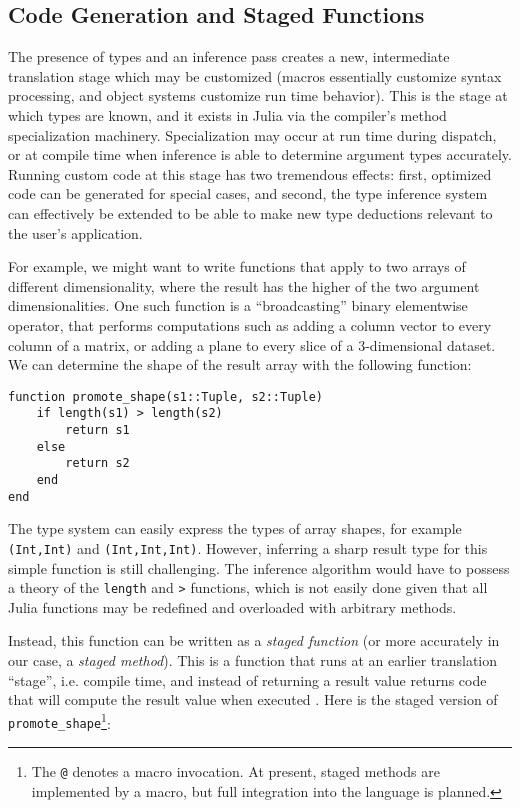 \documentclass[9pt]{sigplanconf}
\begin{document}
\subsection{Code Generation and Staged Functions}

The presence of types and an inference pass creates a new, intermediate
translation stage which may be customized (macros essentially customize
syntax processing, and object systems customize run time behavior).
This is the stage at which types are known, and it exists in Julia via
the compiler's method specialization machinery. Specialization may occur
at run time during dispatch, or at compile time when inference is able
to determine argument types accurately.
Running custom code at this stage has two tremendous effects:
first, optimized code can be generated for special cases, and
second, the type inference system can effectively be extended to be able to
make new type deductions relevant to the user's application.

For example, we might want to write functions that apply to two
arrays of different dimensionality, where the result has the higher of the
two argument dimensionalities. One such function is a ``broadcasting''
binary elementwise operator, that performs computations such as adding a
column vector to every column of a matrix, or adding a plane to every slice
of a 3-dimensional dataset. We can determine the shape of the result
array with the following function:

\begin{verbatim}
function promote_shape(s1::Tuple, s2::Tuple)
    if length(s1) > length(s2)
        return s1
    else
        return s2
    end
end
\end{verbatim}

The type system can easily express the types of array shapes, for example
{\tt (Int,Int)} and {\tt (Int,Int,Int)}. However, inferring a sharp result
type for this simple function is still challenging. The inference algorithm
would have to possess a theory of the {\tt length} and {\tt >} functions,
which is not easily done given that all Julia functions may be redefined
and overloaded with arbitrary methods.

Instead, this function can be written as a \emph{staged function} (or
more accurately in our case, a \emph{staged method}). This is a function
that runs at an earlier translation ``stage'', i.e. compile time, and
instead of returning a result value returns code that will compute the
result value when executed \cite{staging}.
Here is the staged version of
{\tt promote\_shape}\footnote{The {\tt @} denotes a macro invocation. At
present, staged methods are implemented by a macro, but full integration
into the language is planned.}:
\end{document}

